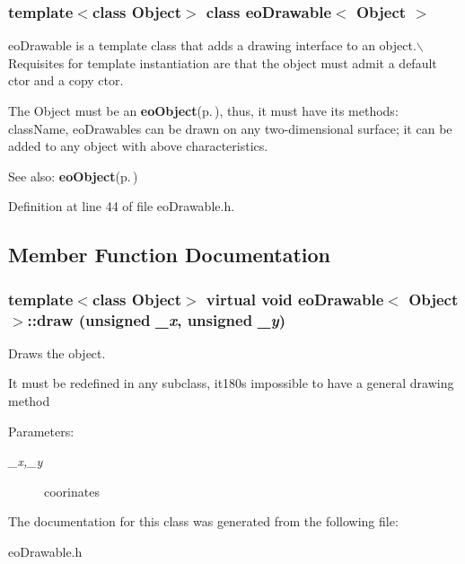 \subsubsection*{template$<$class Object$>$ class eo\-Drawable$<$ Object $>$}

eo\-Drawable is a template class that adds a drawing interface to an object.$\backslash$ Requisites for template instantiation are that the object must admit a default ctor and a copy ctor. 

The Object must be an {\bf eo\-Object}{\rm (p.\,\pageref{classeo_object})}, thus, it must have its methods: class\-Name, eo\-Drawables can be drawn on any two-dimensional surface; it can be added to any object with above characteristics. \begin{Desc}
\item[See also:]{\bf eo\-Object}{\rm (p.\,\pageref{classeo_object})} \end{Desc}




Definition at line 44 of file eo\-Drawable.h.

\subsection{Member Function Documentation}
\subsubsection{\setlength{\rightskip}{0pt plus 5cm}template$<$class Object$>$ virtual void {\bf eo\-Drawable}$<$ Object $>$::draw (unsigned {\em \_\-x}, unsigned {\em \_\-y})\hspace{0.3cm}{\tt  [pure virtual]}}\label{classeo_drawable_a3}


Draws the object. 

It must be redefined in any subclass, it180s impossible to have a general drawing method \begin{Desc}
\item[Parameters:]
\begin{description}
\item[{\em \_\-x,\_\-y}]coorinates \end{description}
\end{Desc}


The documentation for this class was generated from the following file:\begin{CompactItemize}
\item 
eo\-Drawable.h\end{CompactItemize}
